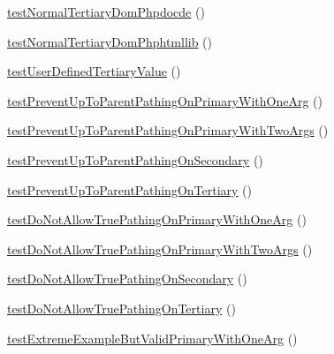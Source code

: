 \begin{DoxyCompactItemize}
\item 
\hyperlink{classtests__php_documentor_setup_clean_converter_name_piece_tests_acb885e0c8267b72bacaa9e9e6fdb654c}{test\-Normal\-Tertiary\-Dom\-Phpdocde} ()
\item 
\hyperlink{classtests__php_documentor_setup_clean_converter_name_piece_tests_a69a90e8f29816b19c27d02e115694bba}{test\-Normal\-Tertiary\-Dom\-Phphtmllib} ()
\item 
\hyperlink{classtests__php_documentor_setup_clean_converter_name_piece_tests_a849f722dc6b4abce84894748fe5eb059}{test\-User\-Defined\-Tertiary\-Value} ()
\item 
\hyperlink{classtests__php_documentor_setup_clean_converter_name_piece_tests_aab426ee6139a18854df4bf6b9f25f5e5}{test\-Prevent\-Up\-To\-Parent\-Pathing\-On\-Primary\-With\-One\-Arg} ()
\item 
\hyperlink{classtests__php_documentor_setup_clean_converter_name_piece_tests_a130ee7ea67d689eb1e29904cc75bc92e}{test\-Prevent\-Up\-To\-Parent\-Pathing\-On\-Primary\-With\-Two\-Args} ()
\item 
\hyperlink{classtests__php_documentor_setup_clean_converter_name_piece_tests_a7a5f0a88f5bca4600e61d6a81401a0f3}{test\-Prevent\-Up\-To\-Parent\-Pathing\-On\-Secondary} ()
\item 
\hyperlink{classtests__php_documentor_setup_clean_converter_name_piece_tests_a65b6589c1b30c477a46c8c06f9255ec9}{test\-Prevent\-Up\-To\-Parent\-Pathing\-On\-Tertiary} ()
\item 
\hyperlink{classtests__php_documentor_setup_clean_converter_name_piece_tests_a722a66f7cb09092911b359e4cc9a840f}{test\-Do\-Not\-Allow\-True\-Pathing\-On\-Primary\-With\-One\-Arg} ()
\item 
\hyperlink{classtests__php_documentor_setup_clean_converter_name_piece_tests_abb26b058378205120d52ed17a9447e49}{test\-Do\-Not\-Allow\-True\-Pathing\-On\-Primary\-With\-Two\-Args} ()
\item 
\hyperlink{classtests__php_documentor_setup_clean_converter_name_piece_tests_a814afb528837db40fddf9d288f9b5547}{test\-Do\-Not\-Allow\-True\-Pathing\-On\-Secondary} ()
\item 
\hyperlink{classtests__php_documentor_setup_clean_converter_name_piece_tests_af133acc5ac169bc2f78a9d7f7f3ea03e}{test\-Do\-Not\-Allow\-True\-Pathing\-On\-Tertiary} ()
\item 
\hyperlink{classtests__php_documentor_setup_clean_converter_name_piece_tests_a21f602443bde04ee163b06512e5f7818}{test\-Extreme\-Example\-But\-Valid\-Primary\-With\-One\-Arg} ()

\end{DoxyCompactItemize}

